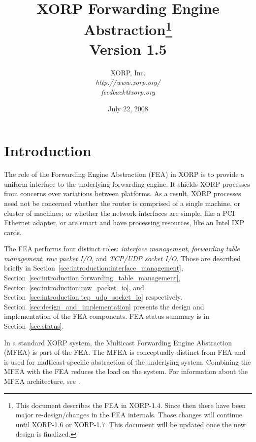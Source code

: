 \documentclass[11pt]{article}
\begin{document}
\title{XORP Forwarding Engine Abstraction\footnote{This document describes the
    FEA in XORP-1.4. Since then there have been major re-design/changes in the
    FEA internals. Those changes will continue until XORP-1.6 or XORP-1.7.
    This document will be updated once the new design is finalized.} \\ 
\vspace{1ex}
Version 1.5}
\author{ XORP, Inc.					\\
         {\it http://www.xorp.org/}			\\
	 {\it feedback@xorp.org}
}
\date{July 22, 2008}

\maketitle


\section{Introduction}
\label{sec:introduction}

The role of the Forwarding Engine Abstraction (FEA) in XORP is to
provide a uniform interface to the underlying forwarding engine.  It
shields XORP processes from concerns over variations between
platforms.  As a result, XORP processes need not be concerned whether
the router is comprised of a single machine, or cluster of machines;
or whether the network interfaces are simple, like a PCI Ethernet
adapter, or are smart and have processing resources, like an Intel IXP
cards.

The FEA performs four distinct roles: \emph{interface management},
\emph{forwarding table management}, \emph{raw packet I/O},
and \emph{TCP/UDP socket I/O}.  Those are
described briefly in
Section~\ref{sec:introduction:interface_management},
Section~\ref{sec:introduction:forwarding_table_management},
Section~\ref{sec:introduction:raw_packet_io},
and Section~\ref{sec:introduction:tcp_udp_socket_io}
respectively.
Section~\ref{sec:design_and_implementation} presents
the design and implementation of the FEA components.
FEA status summary is in Section~\ref{sec:status}.

In a standard XORP system, the Multicast Forwarding Engine Abstraction
(MFEA) is part of the FEA.  The MFEA is conceptually distinct from
FEA and is used for multicast-specific abstraction of the underlying system.
Combining the MFEA with the FEA reduces the load on the system.  For
information about the MFEA architecture, see \cite{xorp:mfea}.
\end{document}
